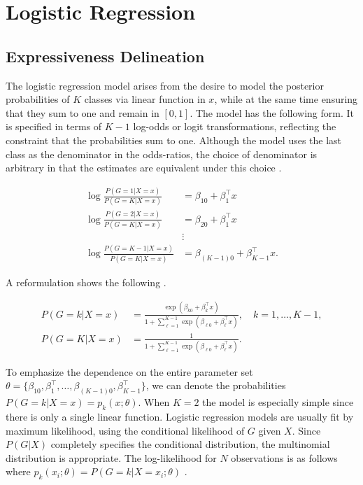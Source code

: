 \documentclass[../../../main.tex]{subfiles}
\begin{document}
\section{Logistic Regression}\label{Appendix:LogReg}

\subsection{Expressiveness Delineation}

The logistic regression model arises from the desire to model the posterior probabilities of $K$ classes via linear function in $x$, while at the same time ensuring that they sum to one and remain in $[0,1]$. The model has the following form. It is specified in terms of $K-1$ log-odds or logit transformations, reflecting the constraint that the probabilities sum to one. Although the model uses the last class as the denominator in the odds-ratios, the choice of denominator is arbitrary in that the estimates are equivalent under this choice \autocite{Hastie2009}.

\begin{equation}
\begin{split}
\log\frac{P(G=1|X=x)}{P(G=K|X=x)} &= \beta_{10}+\beta_1^\top x \\
\log\frac{P(G=2|X=x)}{P(G=K|X=x)} &= \beta_{20}+\beta_1^\top x \\
&\vdots \\
\log\frac{P(G=K-1|X=x)}{P(G=K|X=x)} &= \beta_{(K-1)0}+\beta_{K-1}^\top x.
\end{split}
\end{equation}

A reformulation shows the following \autocite{Hastie2009}.

\begin{equation}
\begin{split}
P(G=k|X=x) &= \frac{\exp(\beta_{k0}+\beta_k^\top x)}{1 + \sum_{\ell=1}^{K-1}\exp(\beta_{\ell0}+\beta_\ell^\top x)}, \quad k=1,\ldots,K-1, \\
P(G=K|X=x) &= \frac{1}{1 + \sum_{\ell=1}^{K-1}\exp(\beta_{\ell0}+\beta_\ell^\top x)}.
\end{split}
\end{equation}

To emphasize the dependence on the entire parameter set $\theta=\{\beta_{10},\beta_1^\top,\ldots,\beta_{(K-1)0},\beta_{K-1}^\top\}$, we can denote the probabilities $P(G=k|X=x)=p_k(x;\theta)$. When $K=2$ the model is especially simple since there is only a single linear function. Logistic regression models are usually fit by maximum likelihood, using the conditional likelihood of $G$ given $X$. Since $P(G|X)$ completely specifies the conditional distribution, the multinomial distribution is appropriate. The log-likelihood for $N$ observations is as follows where $p_k(x_i;\theta)=P(G=k|X=x_i;\theta)$ \autocite{Hastie2009}.
\end{document}
